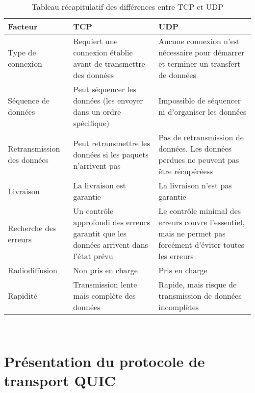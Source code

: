 \begin{table}[]
    \centering
    \begin{tabular}{|p{3cm} | p{6cm} | p{6cm} |}
        \hline
        \textbf{Facteur} & \textbf{TCP} & \textbf{UDP} \\ \hline
        Type de connexion & Requiert une connexion établie avant de transmettre des données & Aucune connexion n’est nécessaire pour démarrer et terminer un transfert de données \\ \hline
        Séquence de données & Peut séquencer les données (les envoyer dans un ordre spécifique) & Impossible de séquencer ni d’organiser les données \\ \hline
        Retransmission des données & Peut retransmettre les données si les paquets n’arrivent pas & Pas de retransmission de données. Les données perdues ne peuvent pas être récupéréess \\ \hline
        Livraison & La livraison est garantie & La livraison n’est pas garantie \\ \hline
        Recherche des erreurs & Un contrôle approfondi des erreurs garantit que les données arrivent dans l’état prévu & Le contrôle minimal des erreurs couvre l’essentiel, mais ne permet pas forcément d’éviter toutes les erreurs \\ \hline
        Radiodiffusion & Non pris en charge & Pris en charge \\ \hline
        Rapidité & Transmission lente mais complète des données & Rapide, mais risque de transmission de données incomplètes \\ \hline
    \end{tabular}\\
    \caption{Tableau récapitulatif des différences entre TCP et UDP }
    \label{tab:TCP_VS_UDP}
\end{table}

\newpage

\section{Présentation du protocole de transport QUIC}
